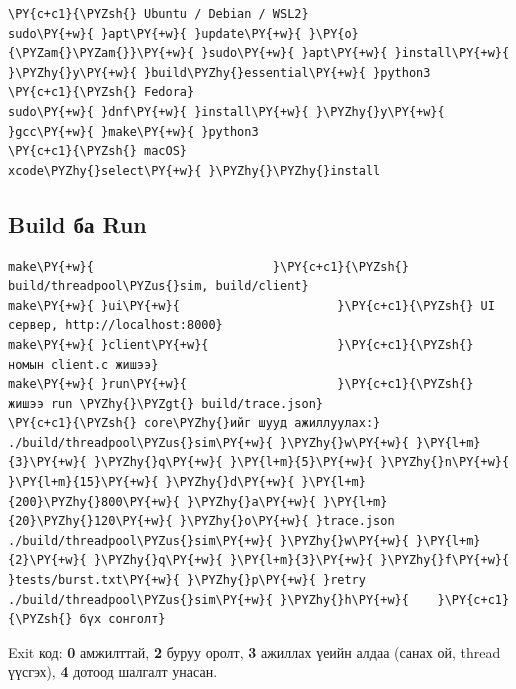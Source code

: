 \documentclass[12pt,a4paper]{article}
\begin{document}
\par\noindent\begin{minipage}{\linewidth}\setlength{\topsep}{1pt}\setlength{\partopsep}{0pt}
\begin{Verbatim}[commandchars=\\\{\}]
\PY{c+c1}{\PYZsh{} Ubuntu / Debian / WSL2}
sudo\PY{+w}{ }apt\PY{+w}{ }update\PY{+w}{ }\PY{o}{\PYZam{}\PYZam{}}\PY{+w}{ }sudo\PY{+w}{ }apt\PY{+w}{ }install\PY{+w}{ }\PYZhy{}y\PY{+w}{ }build\PYZhy{}essential\PY{+w}{ }python3
\PY{c+c1}{\PYZsh{} Fedora}
sudo\PY{+w}{ }dnf\PY{+w}{ }install\PY{+w}{ }\PYZhy{}y\PY{+w}{ }gcc\PY{+w}{ }make\PY{+w}{ }python3
\PY{c+c1}{\PYZsh{} macOS}
xcode\PYZhy{}select\PY{+w}{ }\PYZhy{}\PYZhy{}install
\end{Verbatim}
\end{minipage}

\subsection{Build ба Run}

\par\noindent\begin{minipage}{\linewidth}\setlength{\topsep}{1pt}\setlength{\partopsep}{0pt}
\begin{Verbatim}[commandchars=\\\{\}]
make\PY{+w}{                         }\PY{c+c1}{\PYZsh{} build/threadpool\PYZus{}sim, build/client}
make\PY{+w}{ }ui\PY{+w}{                      }\PY{c+c1}{\PYZsh{} UI сервер, http://localhost:8000}
make\PY{+w}{ }client\PY{+w}{                  }\PY{c+c1}{\PYZsh{} номын client.c жишээ}
make\PY{+w}{ }run\PY{+w}{                     }\PY{c+c1}{\PYZsh{} жишээ run \PYZhy{}\PYZgt{} build/trace.json}
\PY{c+c1}{\PYZsh{} core\PYZhy{}ийг шууд ажиллуулах:}
./build/threadpool\PYZus{}sim\PY{+w}{ }\PYZhy{}w\PY{+w}{ }\PY{l+m}{3}\PY{+w}{ }\PYZhy{}q\PY{+w}{ }\PY{l+m}{5}\PY{+w}{ }\PYZhy{}n\PY{+w}{ }\PY{l+m}{15}\PY{+w}{ }\PYZhy{}d\PY{+w}{ }\PY{l+m}{200}\PYZhy{}800\PY{+w}{ }\PYZhy{}a\PY{+w}{ }\PY{l+m}{20}\PYZhy{}120\PY{+w}{ }\PYZhy{}o\PY{+w}{ }trace.json
./build/threadpool\PYZus{}sim\PY{+w}{ }\PYZhy{}w\PY{+w}{ }\PY{l+m}{2}\PY{+w}{ }\PYZhy{}q\PY{+w}{ }\PY{l+m}{3}\PY{+w}{ }\PYZhy{}f\PY{+w}{ }tests/burst.txt\PY{+w}{ }\PYZhy{}p\PY{+w}{ }retry
./build/threadpool\PYZus{}sim\PY{+w}{ }\PYZhy{}h\PY{+w}{    }\PY{c+c1}{\PYZsh{} бүх сонголт}
\end{Verbatim}
\end{minipage}

Exit код: \textbf{0} амжилттай, \textbf{2} буруу оролт, \textbf{3} ажиллах үеийн алдаа (санах ой, thread үүсгэх), \textbf{4} дотоод шалгалт унасан.
\end{document}
